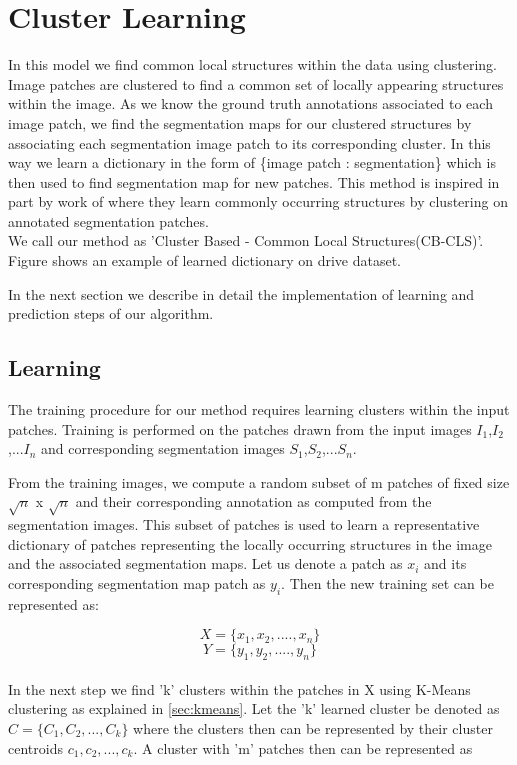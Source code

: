 
\section{Cluster Learning}
In this model we find common local structures within the data using clustering. Image patches are clustered to find a common set of locally appearing structures within the image. As we know the ground truth annotations associated to each image patch, we find the segmentation maps for our clustered structures by associating each segmentation image patch to its corresponding cluster. In this way we learn a dictionary in the form of \{image patch : segmentation\} which is then used to find segmentation map for new patches. This method is inspired in part by work of \citep{lim2013sketch} where they learn commonly occurring structures by clustering on annotated segmentation patches.\\
We call our method as 'Cluster Based - Common Local Structures(CB-CLS)'. Figure shows an example of learned dictionary on drive dataset.

In the next section we describe in detail the implementation of learning and prediction steps of our algorithm.

\subsection{Learning}

The training procedure for our method requires learning clusters within the input patches. Training is performed on the patches drawn from the input images $I_1$,$I_2$,...$I_n$ and corresponding segmentation images $S_1$,$S_2$,...$S_n$. 

From the training images, we compute a random subset of m patches of fixed size $\sqrt{n}$ x $\sqrt{n}$ and their corresponding annotation as computed from the segmentation images. This subset of patches is used to learn a representative dictionary of patches representing the locally occurring structures in the image and the associated segmentation maps. Let us denote a patch as $x_i$ and its corresponding segmentation map patch as $y_i$. Then the new training set can be represented as:

$$
X = \{x_1,x_2,....,x_n\}
$$
$$
Y = \{y_1,y_2,....,y_n\}
$$
\\
In the next step we find 'k' clusters within the patches in X using K-Means clustering as explained in \ref{sec:kmeans}. Let the 'k' learned cluster be denoted as $C = \{C_1,C_2,...,C_k\} $ where the clusters then can be represented by their cluster centroids $c_1, c_2,..., c_k$. A cluster with 'm' patches then can be represented as

